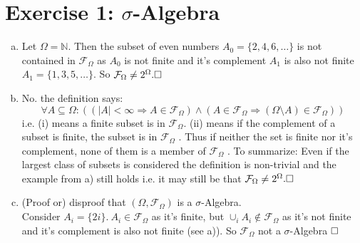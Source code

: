 \documentclass[a4paper]{article}
\begin{document}
	\section*{Exercise 1: $\sigma$-Algebra}\label{sec:exercise1}
   \begin{enumerate}[a)]
       \item Let $\Omega = \mathbb{N}$. Then the subset of even numbers $A_0 = \{2, 4, 6, \dots \}$ is not contained in $\mathcal{F}_{\Omega}$ as $A_0$ is not finite and it's complement $A_1$ is also not finite $A_1 = \{1, 3, 5, \dots \}$.  So $\mathcal{F}_{\Omega} \neq 2^{\Omega}.          \hfill \square$
   
       \item No. the definition says:
       \[\forall A \subseteq \Omega: ((|A| < \infty \Rightarrow A \in \mathcal{F}_{\Omega}) \wedge (A \in \mathcal{F}_{\Omega} \Rightarrow (\Omega \setminus A) \in \mathcal{F}_{\Omega})) \]
        i.e. (i) means a finite subset is in  $\mathcal{F}_{ \Omega}$. (ii) means if the complement of a subset is finite, the subset is in  $\mathcal{F}_{ \Omega}$ . Thus if neither the set is finite nor it's complement, none of them is a member of  $\mathcal{F}_{ \Omega}$ .
   To summarize: Even if the largest class of subsets is considered the definition is non-trivial and the example from a) still holds i.e.  it may still be that $\mathcal{F}_{\Omega} \neq 2^{\Omega}.          \hfill \square$
        \item (Proof or) disproof that $(\Omega, \mathcal{F}_{ \Omega})$ is a $\sigma$-Algebra. \\
            Consider $A_i = \{2i\}. \ A_i \in \mathcal{F}_{ \Omega}$ as it's finite, but $\cup_i A_i \not \in \mathcal{F}_{ \Omega}$ as it's not finite and it's complement is also not finite (see a)). So $\mathcal{F}_{ \Omega}$ not a $\sigma$-Algebra $\hfill \square$
            
   \end{enumerate}
\end{document}

